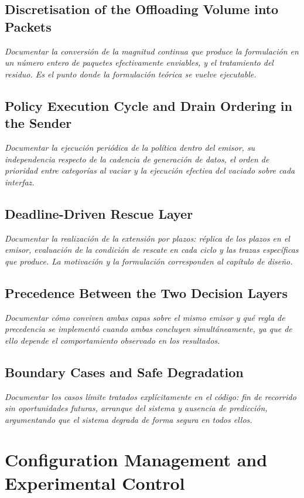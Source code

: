 \subsection{Discretisation of the Offloading Volume into Packets}
\emph{Documentar la conversión de la magnitud continua que produce la
formulación en un número entero de paquetes efectivamente enviables, y el
tratamiento del residuo. Es el punto donde la formulación teórica se vuelve
ejecutable.}

\subsection{Policy Execution Cycle and Drain Ordering in the Sender}
\emph{Documentar la ejecución periódica de la política dentro del emisor, su
independencia respecto de la cadencia de generación de datos, el orden de
prioridad entre categorías al vaciar y la ejecución efectiva del vaciado sobre
cada interfaz.}

\subsection{Deadline-Driven Rescue Layer}
\emph{Documentar la realización de la extensión por plazos: réplica de los plazos
en el emisor, evaluación de la condición de rescate en cada ciclo y las trazas
específicas que produce. La motivación y la formulación corresponden al capítulo
de diseño.}

\subsection{Precedence Between the Two Decision Layers}
\emph{Documentar cómo conviven ambas capas sobre el mismo emisor y qué regla de
precedencia se implementó cuando ambas concluyen simultáneamente, ya que de ello
depende el comportamiento observado en los resultados.}

\subsection{Boundary Cases and Safe Degradation}
\emph{Documentar los casos límite tratados explícitamente en el código: fin de
recorrido sin oportunidades futuras, arranque del sistema y ausencia de
predicción, argumentando que el sistema degrada de forma segura en todos ellos.}

\section{Configuration Management and Experimental Control}

